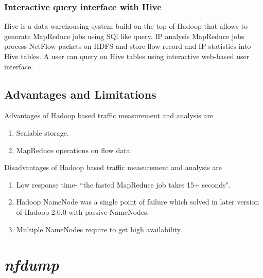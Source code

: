       \subsubsection{Interactive query interface with Hive}
      Hive is a data warehousing system build on the top of Hadoop that allows to generate MapReduce jobs using SQl like query.
      IP analysis MapReduce jobs process NetFlow packets on HDFS and  store flow record and IP statistics into
      Hive tables. A user can query on Hive tables using interactive web-based user interface.
      
      \subsection{Advantages and Limitations}
      Advantages of Hadoop based traffic  measurement and analysis are 
	\begin{enumerate}
	  \item Scalable storage.
	  \item MapReduce operations on flow data.
	\end{enumerate}
      Disadvantages of Hadoop based traffic  measurement and analysis are
	\begin{enumerate}
	 \item Low response time- ``the fasted MapReduce job takes 15+ seconds"\cite{mapreducetime}.
	 \item Hadoop NameNode was a single point of failure which solved in later version of 
	        Hadoop 2.0.0 with passive NameNodes.
	 \item Multiple NameNodes require to get high availability\cite{ha}.
	\end{enumerate}

	
      \section{\emph{nfdump}}\cite{nfdump}
